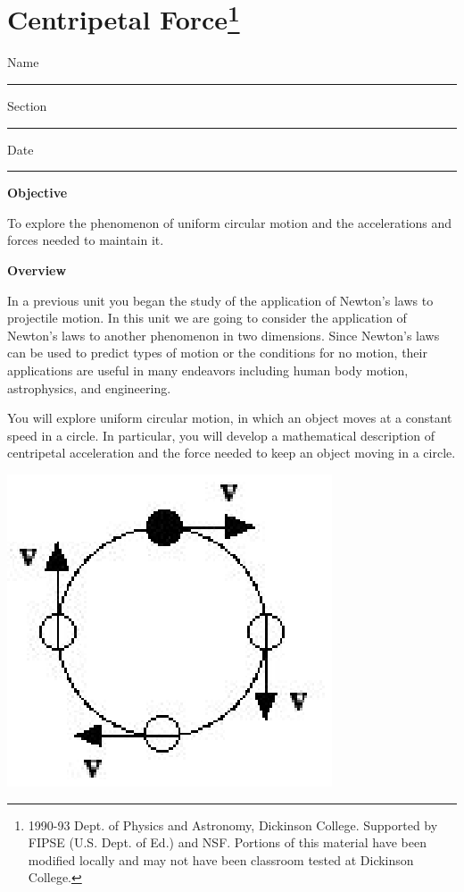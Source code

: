 
\section{Centripetal Force\footnote{
1990-93 Dept. of Physics and Astronomy, Dickinson College. Supported by FIPSE
(U.S. Dept. of Ed.) and NSF. Portions of this material have been modified locally
and may not have been classroom tested at Dickinson College.
}}

Name \rule{2.0in}{0.1pt}\hfill{}Section \rule{1.0in}{0.1pt}\hfill{}Date \rule{1.0in}{0.1pt}

\textbf{Objective} 

To explore the phenomenon of uniform circular motion and the accelerations and
forces needed to maintain it.

\textbf{Overview} 

In a previous unit you began the study of the application of Newton's laws to
projectile motion. In this unit we are going to consider the application of
Newton's laws to another phenomenon in two dimensions. Since Newton's laws can
be used to predict types of motion or the conditions for no motion, their applications
are useful in many endeavors including human body motion, astrophysics, and
engineering.

You will explore uniform circular motion, in which an object moves at a constant
speed in a circle. In particular, you will develop a mathematical description
of centripetal acceleration and the force needed to keep an object moving in
a circle.

\vspace{0.3cm}
{\par\centering \includegraphics{centripetal_fig1.eps} \par}
\vspace{0.3cm}

